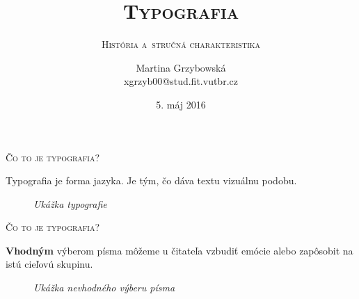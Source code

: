 \documentclass[xcolor=dvipsnames]{beamer}
\begin{document}
	
	\title{\textsc{\huge{Typografia}}}
	\subtitle{\textsc{\small{História a~stručná charakteristika}}}
	\author{\scriptsize{Martina Grzybowská\\xgrzyb00@stud.fit.vutbr.cz}}
	\date{\scriptsize{5. máj 2016}}
	\maketitle


\begin{frame}{\textsc{\large{Čo to je typografia?}}}
	\begin{center}
		Typografia je forma jazyka. Je tým, čo dáva textu vizuálnu podobu.
	\end{center}
	\begin{figure}[ht]
		\begin{center}
    		\caption{\textit{Ukážka typografie}}
		\end{center}
	\end{figure}
\end{frame}


\begin{frame}{\textsc{\large{Čo to je typografia?}}}
	\begin{center}
		\textbf{\color{red}Vhodným} výberom písma môžeme u čitateľa vzbudiť emócie alebo zapôsobit na istú cieľovú skupinu. 
	\end{center}
	\begin{figure}[ht]
		\begin{center}
    		\caption{\textit{Ukážka nevhodného výberu písma}}
		\end{center}
	\end{figure}
\end{frame}
\end{document}
